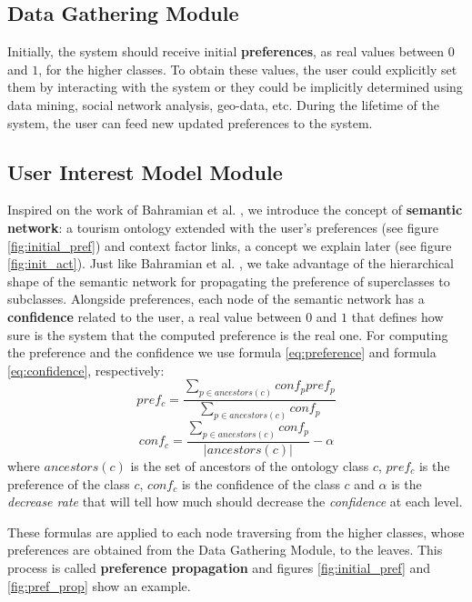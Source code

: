 \subsection{Data Gathering Module}
Initially, the system should receive initial \textbf{preferences}, as real values between $0$ and $1$, for the higher classes. To obtain these values, the user could explicitly set them by interacting with the system or they could be implicitly determined using data mining, social network analysis, geo-data, etc. During the lifetime of the system, the user can feed new updated preferences to the system.

\subsection{User Interest Model Module}
Inspired on the work of Bahramian et al. \cite{bahramian_abbaspour_claramunt_2017}, we introduce the concept of \textbf{semantic network}: a tourism ontology extended with the user's preferences (see figure \ref{fig:initial_pref}) and context factor links, a concept we explain later (see figure \ref{fig:init_act}). Just like Bahramian et al. \cite{bahramian_abbaspour_claramunt_2017}, we take advantage of the hierarchical shape of the semantic network for propagating the preference of superclasses to subclasses. Alongside preferences, each node of the semantic network has a \textbf{confidence} related to the user, a real value between $0$ and $1$ that defines how sure is the system that the computed preference is the real one. For computing the preference and the confidence we use formula \ref{eq:preference} and formula \ref{eq:confidence}, respectively:
\begin{equation} \label{eq:preference}
    pref_c = \frac{\displaystyle \sum_{p \in ancestors(c)}{conf_p pref_p}}
    {\displaystyle  \sum_{p \in ancestors(c)} {conf_p}}
\end{equation}
\begin{equation} \label{eq:confidence}
    conf_c = \frac{\displaystyle \sum_{p \in ancestors(c)} {conf_p}}{|ancestors(c)|} - \alpha
\end{equation}
where $ancestors(c)$ is the set of ancestors of the ontology class $c$, $pref_c$ is the preference of the class $c$, $conf_c$ is the confidence of the class $c$ and $\alpha$ is the \textit{decrease rate} that will tell how much should decrease the \textit{confidence} at each level. 

These formulas are applied to each node traversing from the higher classes, whose preferences are obtained from the Data Gathering Module, to the leaves. This process is called \textbf{preference propagation} and figures \ref{fig:initial_pref} and \ref{fig:pref_prop} show an example.

